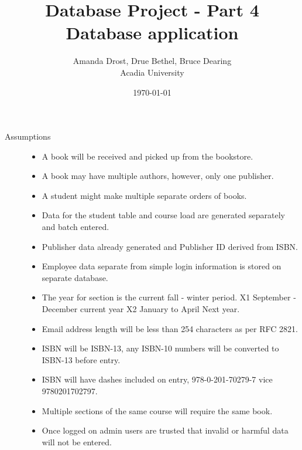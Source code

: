 \documentclass{article}
\begin{document}
\title{Database Project - Part 4 Database application}
    \author{Amanda Drost, Drue Bethel, Bruce Dearing\\
    Acadia University}
\date{\today}
\maketitle
\clearpage

\begin{description}

    \item[Assumptions] \hfill 
        \begin{itemize}
            \item A book will be received and picked up from the bookstore.
            \item A book may have multiple authors, however, only one publisher.
            \item A student might make multiple separate orders of books.
            \item Data for the student table and course load are generated separately
                 and batch entered.
            \item Publisher data already generated and Publisher ID derived from ISBN.
            \item Employee data separate from simple login information is stored on 
                  separate database.
            \item The year for section is the current fall - winter period. X1 September - December current year X2 January to April Next year.
            \item Email address length will be less than 254 characters as per RFC 2821.
            \item ISBN will be ISBN-13, any ISBN-10 numbers will be converted to ISBN-13 before entry.
            \item ISBN will have dashes included on entry, 978-0-201-70279-7 vice 9780201702797.
            \item Multiple sections of the same course will require the same book.

            \item Once logged on admin users are trusted that invalid or harmful  
                data will not be entered.
        \end{itemize}
\end{description}
\end{document}

